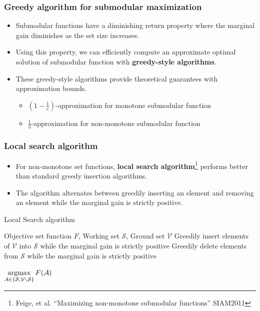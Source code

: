 \documentclass[10pt,mathserif]{beamer}
\newcommand{\algorithmicinput}{\textbf{input}}
\newcommand{\algorithmicoutput}{\textbf{output}}
\newcommand{\INPUT}{\item[\algorithmicinput]}
\newcommand{\OUTPUT}{\item[\algorithmicoutput]}
\begin{document}
\begin{frame}
\frametitle{Greedy algorithm for submodular maximization}
\begin{itemize}\itemsep=12pt
\item Submodular functions have a diminishing return property where the marginal gain diminishes as the set size increases.\pause
\item Using this property, we can efficiently compute an approximate optimal solution of submodular function with \textbf{greedy-style algorithms}.\pause
\item These greedy-style algorithms provide theoretical guarantees with approximation bounds.
\vspace{0.5em}
\begin{itemize}\itemsep=6pt
    \item $(1-\frac{1}{e})$-approximation for monotone submodular function
    \item $\frac{1}{3}$-approximation for non-monotone submodular function
\end{itemize} 
\end{itemize}
\end{frame}

\begin{frame}
\frametitle{Local search algorithm}
\begin{itemize}\itemsep=10pt
        \item For non-monotone set functions, \textbf{local search algorithm}\footnote{{\color{blue} Feige, et al.} ``Maximizing non-monotone submodular functions'' {\color{gray} SIAM2011}} performs better than standard greedy insertion algorithms.\pause
    \item The algorithm alternates between greedily inserting an element and removing an element while the marginal gain is strictly positive.\pause
\end{itemize}
\setcounter{algorithm}{0}
\begin{algorithm}[H]
\footnotesize
\caption{Local Search algorithm}
\label{alg:local_search}
\begin{algorithmic}[1]
\INPUT Objective set function $F$, Working set $\mathcal{S}$, Ground set $\mathcal{V}$
\STATE Greedily insert elements of $\mathcal{V}$ into $\mathcal{S}$ while the marginal gain is strictly positive
\STATE Greedily delete elements from $\mathcal{S}$ while the marginal gain is strictly positive
\ENDFOR
\OUTPUT $\mathop{\rm argmax}\limits_{\mathcal{A} \in \{\mathcal{S}, \mathcal{V} \setminus \mathcal{S} \}} F(\mathcal{A})$
\end{algorithmic}
\end{algorithm}
\end{frame}
\end{document}
